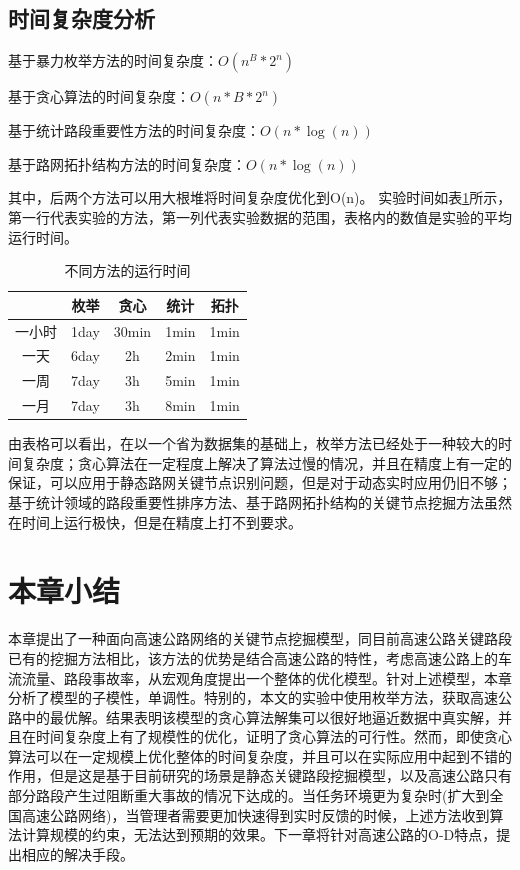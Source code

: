 			\subsection{时间复杂度分析}
				基于暴力枚举方法的时间复杂度：$O({n^B}*{2^n})$

				基于贪心算法的时间复杂度：$O(n*B*{2^n})$

				基于统计路段重要性方法的时间复杂度：$O(n*\log (n))$

				基于路网拓扑结构方法的时间复杂度：$O(n*\log (n))$

				其中，后两个方法可以用大根堆将时间复杂度优化到O(n)。
				实验时间如表\ref{table1}所示，第一行代表实验的方法，第一列代表实验数据的范围，表格内的数值是实验的平均运行时间。

				\begin{table}[h]
				\centering
				\begin{tabular}{|c|c|c|c|c|}
				\hline
				\hline
				   &   枚举 &   贪心 &   统计 &   拓扑 \\
				\hline
				  一小时 &   1day &   30min &   1min &   1min \\
				\hline
				  一天 &   6day &   2h &   2min &   1min \\
				\hline
				  一周 &   7day &   3h &   5min &   1min \\
				\hline
				  一月 &   7day &   3h &   8min &   1min \\
				\hline
				\end{tabular}
				\caption{不同方法的运行时间}
				\label{table1}
				\end{table} 

				由表格可以看出，在以一个省为数据集的基础上，枚举方法已经处于一种较大的时间复杂度；贪心算法在一定程度上解决了算法过慢的情况，并且在精度上有一定的保证，可以应用于静态路网关键节点识别问题，但是对于动态实时应用仍旧不够；基于统计领域的路段重要性排序方法、基于路网拓扑结构的关键节点挖掘方法虽然在时间上运行极快，但是在精度上打不到要求。

		\section{本章小结}
			本章提出了一种面向高速公路网络的关键节点挖掘模型，同目前高速公路关键路段已有的挖掘方法相比，该方法的优势是结合高速公路的特性，考虑高速公路上的车流流量、路段事故率，从宏观角度提出一个整体的优化模型。针对上述模型，本章分析了模型的子模性，单调性。特别的，本文的实验中使用枚举方法，获取高速公路中的最优解。结果表明该模型的贪心算法解集可以很好地逼近数据中真实解，并且在时间复杂度上有了规模性的优化，证明了贪心算法的可行性。然而，即使贪心算法可以在一定规模上优化整体的时间复杂度，并且可以在实际应用中起到不错的作用，但是这是基于目前研究的场景是静态关键路段挖掘模型，以及高速公路只有部分路段产生过阻断重大事故的情况下达成的。当任务环境更为复杂时(扩大到全国高速公路网络)，当管理者需要更加快速得到实时反馈的时候，上述方法收到算法计算规模的约束，无法达到预期的效果。下一章将针对高速公路的O-D特点，提出相应的解决手段。





			
